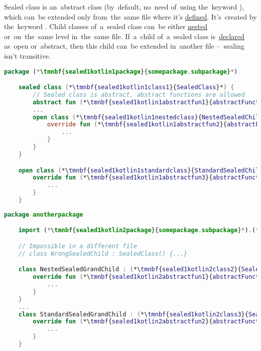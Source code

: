 Sealed class is an~abstract class (by~default, no~need of~using the~keyword ), which can~be extended only from~the~same file where it's \hyperref[declarationdefinition]{defined}.
It's~created by the~keyword .
Child classes of~a~sealed class can~be either \hyperref[kotlininnerclass]{nested} or~on~the~same level in~the~same file.
If~a~child of~a~sealed class is~\hyperref[declarationdefinition]{declared} as~open or~abstract, then this child can~be extended in~another file --~sealing isn't transitive.

\enlargethispage{20mm}
\thispagestyle{empty}
\example
\begin{lstlisting}[language=Kotlin, title={File with a~sealed class}]
    package (*\tmnbf{sealed1kotlin1package}{somepackage.subpackage}*)

    sealed class (*\tmnbf{sealed1kotlin1class1}{SealedClass}*) {
        // Sealed class is abstract, abstract functions are allowed
        abstract fun (*\tmnbf{sealed1kotlin1abstractfun1}{abstractFunction}*)()
        ...
        open class (*\tmnbf{sealed1kotlin1nestedclass}{NestedSealedChild}*) : (*\tmnbf{sealed1kotlin1class2}{SealedClass}*)() {
            override fun (*\tmnbf{sealed1kotlin1abstractfun2}{abstractFunction}*)() {
                ...
            }
        }
    }

    open class (*\tmnbf{sealed1kotlin1standardclass}{StandardSealedChild}*) : (*\tmnbf{sealed1kotlin1class3}{SealedClass}*)() {
        override fun (*\tmnbf{sealed1kotlin1abstractfun3}{abstractFunction}*)() {
            ...
        }
    }
\end{lstlisting}
\begin{lstlisting}[language=Kotlin, title={Another file with extensions of~children of~the~sealed class}]
    package anotherpackage

    import (*\tmnbf{sealed1kotlin2package}{somepackage.subpackage}*).(*\tmnbf{sealed1kotlin2class1}{SealedClass}*)

    // Impossible in a different file
    // class WrongSealedChild : SealedClass() {...}

    class NestedSealedGrandChild : (*\tmnbf{sealed1kotlin2class2}{SealedClass}*).(*\tmnbf{sealed1kotlin2nestedclass}{NestedSealedChild}*)() {
        override fun (*\tmnbf{sealed1kotlin2abstractfun1}{abstractFunction}*)() {
            ...
        }
    }
    ...
    class StandardSealedGrandChild : (*\tmnbf{sealed1kotlin2class3}{SealedClass}*).(*\tmnbf{sealed1kotlin2standardclass}{StandardSealedChild}*)() {
        override fun (*\tmnbf{sealed1kotlin2abstractfun2}{abstractFunction}*)() {
            ...
        }
    }
\end{lstlisting}
